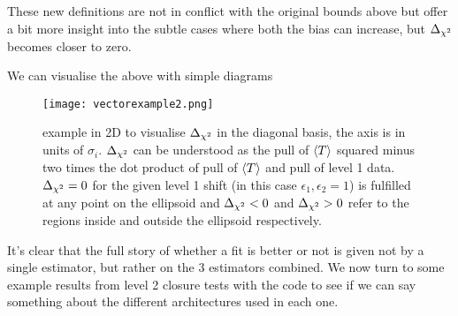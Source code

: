 These new definitions are not in conflict with the original bounds above but
offer a bit more insight into the subtle cases where both the bias can increase,
but $\Delta_{\chi^{2}}$ becomes closer to zero.

We can visualise the above with simple diagrams

\begin{figure}[!h]
    \centering
    \texttt{[image: vectorexample2.png]}
    \caption{example in 2D to visualise $\Delta_{\chi^{2}}$ in the diagonal basis, the axis
    is in units of $\sigma_{i}$. $\Delta_{\chi^{2}}$ can be understood as the pull of
    $\langle T \rangle$ squared minus two times the dot product of pull of $\langle T \rangle$ and pull of
    level 1 data. $\Delta_{\chi^{2}} = 0$ for the given level 1 shift (in this case
    $\epsilon_1, \epsilon_2 = 1$) is fulfilled at any point on the ellipsoid and
    $\Delta_{\chi^{2}}<0$ and $\Delta_{\chi^{2}}>0$ refer to the regions inside and outside the ellipsoid
    respectively.}
    \label{fig:vectorexample}
\end{figure}

It's clear that the full story of whether a fit is better or not is given not
by a single estimator, but rather on the 3 estimators combined. We now turn to
some example results from level 2 closure tests with the \nfit code to see if we
can say something about the different architectures used in each one.

